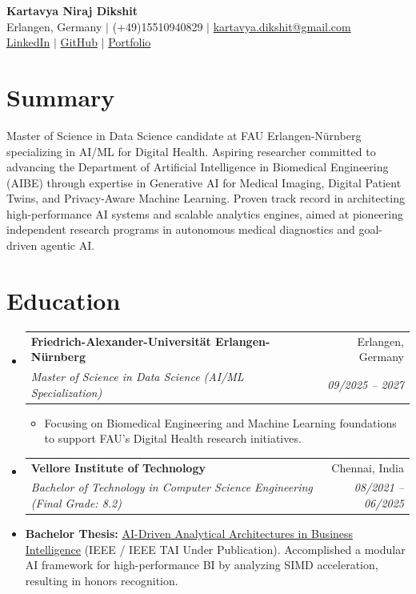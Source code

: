 \documentclass[10pt,a4paper]{article}
\makeatletter
\newcommand{\resumeItem}[1]{\item\small{#1}}
\newcommand{\resumeSubheading}[4]{
  \vspace{-1pt}\item
    \begin{tabular*}{1.0\textwidth}[t]{l@{\extracolsep{\fill}}r}
      \textbf{#1} & #2 \\
      \textit{\small#3} & \textit{\small #4} \\
    \end{tabular*}\vspace{-5pt}
}
\makeatother
\begin{document}
\begin{center}
    \textbf{\huge Kartavya Niraj Dikshit} \\ \vspace{4pt}
    \small Erlangen, Germany $|$ (+49)15510940829 $|$ \href{mailto:kartavya.dikshit@gmail.com}{kartavya.dikshit@gmail.com} \\
    \small \href{https://www.linkedin.com/in/kartavya-dikshit}{LinkedIn} $|$ \href{https://github.com/KartavyaDikshit}{GitHub} $|$ \href{https://kartavyadikshit.github.io/}{Portfolio}
\end{center}

\section{Summary}
Master of Science in Data Science candidate at FAU Erlangen-Nürnberg specializing in AI/ML for Digital Health. Aspiring researcher committed to advancing the Department of Artificial Intelligence in Biomedical Engineering (AIBE) through expertise in Generative AI for Medical Imaging, Digital Patient Twins, and Privacy-Aware Machine Learning. Proven track record in architecting high-performance AI systems and scalable analytics engines, aimed at pioneering independent research programs in autonomous medical diagnostics and goal-driven agentic AI.

\section{Education}
\begin{itemize}[label={}]
    \resumeSubheading
      {Friedrich-Alexander-Universität Erlangen-Nürnberg}{Erlangen, Germany}
      {Master of Science in Data Science (AI/ML Specialization)}{09/2025 -- 2027}
      \begin{itemize}
          \resumeItem{Focusing on Biomedical Engineering and Machine Learning foundations to support FAU's Digital Health research initiatives.}
      \end{itemize}
    \resumeSubheading
      {Vellore Institute of Technology}{Chennai, India}
      {Bachelor of Technology in Computer Science Engineering (Final Grade: 8.2)}{08/2021 -- 06/2025}
      \resumeItem{\textbf{Bachelor Thesis:} \href{https://github.com/KartavyaDikshit}{AI-Driven Analytical Architectures in Business Intelligence} (IEEE / IEEE TAI Under Publication). Accomplished a modular AI framework for high-performance BI by analyzing SIMD acceleration, resulting in honors recognition.}
\end{itemize}
\end{document}

